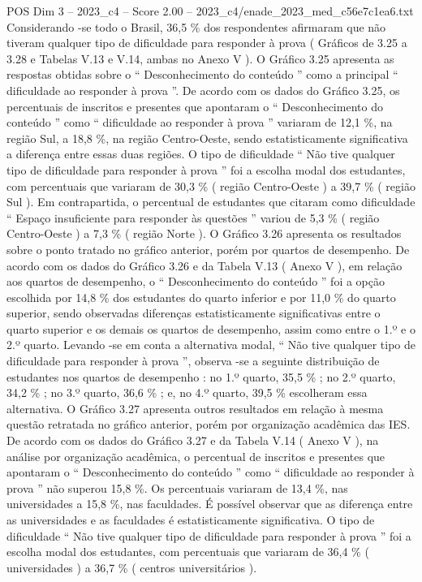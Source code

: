 \begin{textsample}{POS Dim 3 – 2023\_c4 – Score 2.00 – 2023\_c4/enade\_2023\_med\_c56e7c1ea6.txt}
Considerando -se todo o Brasil, 36,5 \% dos respondentes afirmaram que não tiveram qualquer tipo de dificuldade para responder à prova ( Gráficos de 3.25 a 3.28 e Tabelas V.13 e V.14, ambas no Anexo V ).
O Gráfico 3.25 apresenta as respostas obtidas sobre o “ Desconhecimento do conteúdo ” como a principal “ dificuldade ao responder à prova ”.
De acordo com os dados do Gráfico 3.25, os percentuais de inscritos e presentes que apontaram o “ Desconhecimento do conteúdo ” como “ dificuldade ao responder à prova ” variaram de 12,1 \%, na região Sul, a 18,8 \%, na região Centro-Oeste, sendo estatisticamente significativa a diferença entre essas duas regiões.
O tipo de dificuldade “ Não tive qualquer tipo de dificuldade para responder à prova ” foi a escolha modal dos estudantes, com percentuais que variaram de 30,3 \% ( região Centro-Oeste ) a 39,7 \% ( região Sul ).
Em contrapartida, o percentual de estudantes que citaram como dificuldade “ Espaço insuficiente para responder às questões ” variou de 5,3 \% ( região Centro-Oeste ) a 7,3 \% ( região Norte ).
O Gráfico 3.26 apresenta os resultados sobre o ponto tratado no gráfico anterior, porém por quartos de desempenho.
De acordo com os dados do Gráfico 3.26 e da Tabela V.13 ( Anexo V ), em relação aos quartos de desempenho, o “ Desconhecimento do conteúdo ” foi a opção escolhida por 14,8 \% dos estudantes do quarto inferior e por 11,0 \% do quarto superior, sendo observadas diferenças estatisticamente significativas entre o quarto superior e os demais os quartos de desempenho, assim como entre o 1.º e o 2.º quarto.
Levando -se em conta a alternativa modal, “ Não tive qualquer tipo de dificuldade para responder à prova ”, observa -se a seguinte distribuição de estudantes nos quartos de desempenho : no 1.º quarto, 35,5 \% ; no 2.º quarto, 34,2 \% ; no 3.º quarto, 36,6 \% ; e, no 4.º quarto, 39,5 \% escolheram essa alternativa.
O Gráfico 3.27 apresenta outros resultados em relação à mesma questão retratada no gráfico anterior, porém por organização acadêmica das IES.
De acordo com os dados do Gráfico 3.27 e da Tabela V.14 ( Anexo V ), na análise por organização acadêmica, o percentual de inscritos e presentes que apontaram o “ Desconhecimento do conteúdo ” como “ dificuldade ao responder à prova ” não superou 15,8 \%.
Os percentuais variaram de 13,4 \%, nas universidades a 15,8 \%, nas faculdades.
É possível observar que as diferença entre as universidades e as faculdades é estatisticamente significativa.
O tipo de dificuldade “ Não tive qualquer tipo de dificuldade para responder à prova ” foi a escolha modal dos estudantes, com percentuais que variaram de 36,4 \% ( universidades ) a 36,7 \% ( centros universitários ).

\end{textsample}
